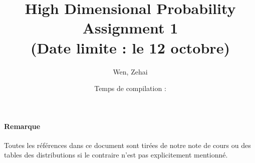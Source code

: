 \documentclass[../main.tex]{subfiles}
\title{High Dimensional Probability Assignment 1 \\ (Date limite : le 12 octobre)}
\author{Wen, Zehai }
\date{Temps de compilation : \DTMnow}
\begin{document}
\maketitle

\paragraph{Remarque}
Toutes les références dans ce document sont tirées de notre note de cours ou 
des tables des distributions si le contraire n'est pas explicitement mentionné.



\end{document}
